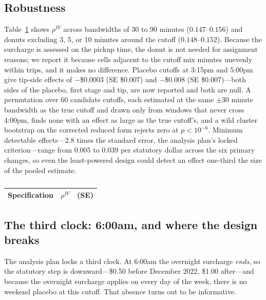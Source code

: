 \subsection{Robustness}
Table~\ref{tab:bw3} shows $\rho^{IV}$ across bandwidths of 30 to 90
minutes ($0.147$--$0.156$) and donuts excluding 3, 5, or 10 minutes
around the cutoff ($0.148$--$0.152$). Because the surcharge is assessed
on the pickup time, the donut is not needed for assignment reasons; we
report it because cells adjacent to the cutoff mix minutes unevenly
within trips, and it makes no difference. Placebo cutoffs at 3:15pm and
5:00pm give tip-side effects of $-$\$0.0003 (SE \$0.007) and $-$\$0.008
(SE \$0.007)---both sides of the placebo, first stage and tip, are now
reported and both are null. A permutation over 60 candidate cutoffs,
each estimated at the same $\pm 30$ minute bandwidth as the true cutoff
and drawn only from windows that never cross 4:00pm, finds none with an
effect as large as the true cutoff's, and a wild cluster bootstrap on
the corrected reduced form rejects zero at $p < 10^{-6}$. Minimum
detectable effects---2.8 times the standard error, the analysis plan's
locked criterion---range from $0.005$ to $0.039$ per statutory dollar
across the six primary changes, so even the least-powered design could
detect an effect one-third the size of the pooled estimate.

\begin{table}[!htbp]
  \centering
  \singlespacing
  \caption{}
  \label{tab:bw3}
  \small
  \begin{tabular}{@{}lcc@{}}
    \toprule
    Specification & $\rho^{IV}$ & (SE) \\
    \midrule
    
    \bottomrule
  \end{tabular}
\end{table}

\subsection{The third clock: 6:00am, and where the design breaks}
\label{sec:results-6am}
The analysis plan locks a third clock. At 6:00am the overnight surcharge
\emph{ends}, so the statutory step is downward---\$0.50 before December
2022, \$1.00 after---and because the overnight surcharge applies on
every day of the week, there is no weekend placebo at this cutoff. That
absence turns out to be informative.

